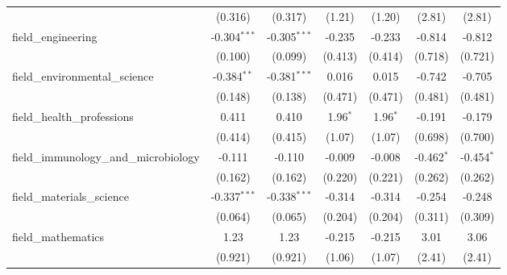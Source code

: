 \begin{tabular}{lcccccc}
                                                               & (0.316)        & (0.317)        & (1.21)         & (1.20)         & (2.81)        & (2.81)\\   
   field\_engineering                                          & -0.304$^{***}$ & -0.305$^{***}$ & -0.235         & -0.233         & -0.814        & -0.812\\   
                                                               & (0.100)        & (0.099)        & (0.413)        & (0.414)        & (0.718)       & (0.721)\\   
   field\_environmental\_science                               & -0.384$^{**}$  & -0.381$^{***}$ & 0.016          & 0.015          & -0.742        & -0.705\\   
                                                               & (0.148)        & (0.138)        & (0.471)        & (0.471)        & (0.481)       & (0.481)\\   
   field\_health\_professions                                  & 0.411          & 0.410          & 1.96$^{*}$     & 1.96$^{*}$     & -0.191        & -0.179\\   
                                                               & (0.414)        & (0.415)        & (1.07)         & (1.07)         & (0.698)       & (0.700)\\   
   field\_immunology\_and\_microbiology                        & -0.111         & -0.110         & -0.009         & -0.008         & -0.462$^{*}$  & -0.454$^{*}$\\   
                                                               & (0.162)        & (0.162)        & (0.220)        & (0.221)        & (0.262)       & (0.262)\\   
   field\_materials\_science                                   & -0.337$^{***}$ & -0.338$^{***}$ & -0.314         & -0.314         & -0.254        & -0.248\\   
                                                               & (0.064)        & (0.065)        & (0.204)        & (0.204)        & (0.311)       & (0.309)\\   
   field\_mathematics                                          & 1.23           & 1.23           & -0.215         & -0.215         & 3.01          & 3.06\\   
                                                               & (0.921)        & (0.921)        & (1.06)         & (1.07)         & (2.41)        & (2.41)\\   

\end{tabular}
